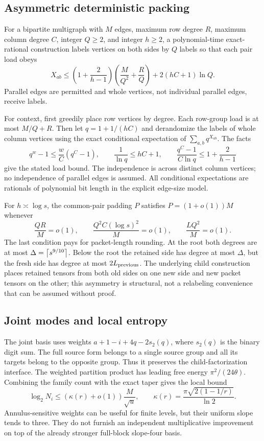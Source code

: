 \documentclass[11pt,letterpaper]{article}
\theoremstyle{remark}\newtheorem{remark}[theorem]{Remark}
\begin{document}
\subsection{Asymmetric deterministic packing}
\begin{lemma}\label{lem:packing}
For a bipartite multigraph with $M$ edges, maximum row degree $R$, maximum column degree $C$, integer $Q\ge2$, and integer $h\ge2$, a polynomial-time exact-rational construction labels vertices on both sides by $Q$ labels so that each pair load obeys
\[
 X_{ab}\le \left(1+\frac2{h-1}\right)
       \left(\frac{M}{Q^2}+\frac RQ\right)+2(hC+1)\ln Q.
\]
Parallel edges are permitted and whole vertices, not individual parallel edges, receive labels.
\end{lemma}
For context, first greedily place row vertices by degree. Each row-group load is at most $M/Q+R$. Then let $q=1+1/(hC)$ and derandomize the labels of whole column vertices using the exact conditional expectation of $\sum_{a,b}q^{X_{ab}}$. The facts
\[
 q^w-1\le\frac wC(q^C-1),\qquad
 \frac1{\ln q}\le hC+1,\qquad
 \frac{q^C-1}{C\ln q}\le1+\frac2{h-1}
\]
give the stated load bound. The independence is across distinct column vertices; no independence of parallel edges is assumed. All conditional expectations are rationals of polynomial bit length in the explicit edge-size model.

For $h\asymp\log s$, the common-pair padding $P$ satisfies $P=(1+o(1))M$ whenever
\begin{equation}\label{eq:pack-conditions}
 \frac{QR}{M}=o(1),\qquad
 \frac{Q^2C(\log s)^2}{M}=o(1),\qquad
 \frac{LQ^2}{M}=o(1).
\end{equation}
The last condition pays for packet-length rounding. At the root both degrees are at most $\Delta=\left\lceil s^{9/10}\right\rceil$. Below the root the retained side has degree at most $\Delta$, but the fresh side has degree at most $2L_{\rm previous}$. The underlying child construction places retained tensors from both old sides on one new side and new packet tensors on the other; this asymmetry is structural, not a relabeling convenience that can be assumed without proof.

\subsection{Joint modes and local entropy}
The joint basis uses weights $a+1-i+4q-2s_2(q)$, where $s_2(q)$ is the binary digit sum. The full source form belongs to a single source group and all its targets belong to the opposite group. Thus it preserves the child-factorization interface. The weighted partition product has leading free energy $\pi^2/(24\theta)$. Combining the family count with the exact taper gives the local bound
\begin{equation}\label{eq:local}
 \log_2 N_i\le(\kappa(r)+o(1))\frac{M}{\sqrt u},
 \qquad \kappa(r)=\frac{\pi\sqrt{2(1-1/r)}}{\ln2}.
\end{equation}
Annulus-sensitive weights can be useful for finite levels, but their uniform slope tends to three. They do not furnish an independent multiplicative improvement on top of the already stronger full-block slope-four basis.
\end{document}
